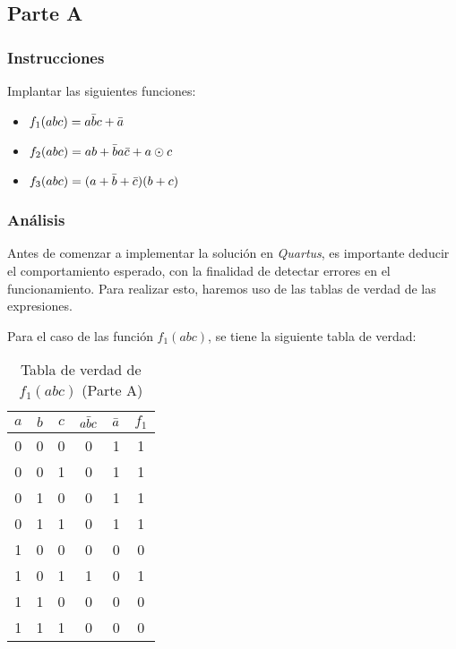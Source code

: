 \documentclass[../procedimientos.tex]{subfiles}
\begin{document}
\clearpage
\subsection{Parte A}
\subsubsection{Instrucciones}
Implantar las siguientes funciones:
\begin{itemize}
  \item $f_1 (abc) = a\bar{b}c + \bar{a}$
  \item $f_2 (abc) = ab + \bar{b}a\bar{c} + a \odot c$
  \item $f_3 (abc) = (a + \bar{b} + \bar{c}) (b + c)$
\end{itemize}

\subsubsection{Análisis}
Antes de comenzar a implementar la solución en \textit{Quartus}, es importante 
deducir el comportamiento esperado, con la finalidad de detectar errores en el 
funcionamiento. Para realizar esto, haremos uso de las tablas de verdad de las 
expresiones.

Para el caso de las función $f_1(abc)$, se tiene la siguiente tabla de verdad:
\begin{table}[H]
  \centering
  \begin{tabular}{ccc|cc|c}
    \hline
    $a$ & $b$ & $c$ & $a\bar{b}c$ & $\bar{a}$ & $f_1$\\
    \hline
    0 & 0 & 0 & 0 & 1 & 1\\
    0 & 0 & 1 & 0 & 1 & 1\\
    0 & 1 & 0 & 0 & 1 & 1\\
    0 & 1 & 1 & 0 & 1 & 1\\
    1 & 0 & 0 & 0 & 0 & 0\\
    1 & 0 & 1 & 1 & 0 & 1\\
    1 & 1 & 0 & 0 & 0 & 0\\
    1 & 1 & 1 & 0 & 0 & 0\\
    \hline
  \end{tabular}
  \caption{Tabla de verdad de $f_1(abc)$ (Parte A)}
  \label{tab:a_f1}
\end{table}
\end{document}

